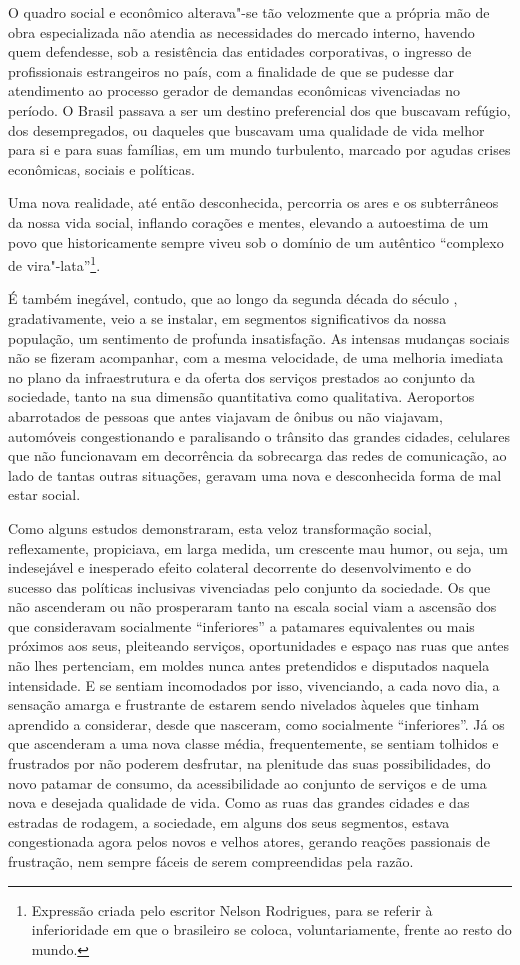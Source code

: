 O quadro social e econômico alterava"-se tão velozmente que a própria mão
de obra especializada não atendia as necessidades do mercado interno,
havendo quem defendesse, sob a resistência das entidades corporativas, o
ingresso de profissionais estrangeiros no país, com a finalidade de que
se pudesse dar atendimento ao processo gerador de demandas econômicas
vivenciadas no período. O Brasil passava a ser um destino preferencial
dos que buscavam refúgio, dos desempregados, ou daqueles que buscavam
uma qualidade de vida melhor para si e para suas famílias, em um mundo
turbulento, marcado por agudas crises econômicas, sociais e políticas.

Uma nova realidade, até então desconhecida, percorria os ares e os
subterrâneos da nossa vida social, inflando corações e mentes, elevando
a autoestima de um povo que historicamente sempre viveu sob o domínio de
um autêntico ``complexo de vira"-lata''\footnote{Expressão criada
  pelo escritor Nelson Rodrigues, para se referir à inferioridade em que
  o brasileiro se coloca, voluntariamente, frente ao resto do mundo.}.

É também inegável, contudo, que ao longo da segunda década do século
, gradativamente, veio a se instalar, em segmentos significativos da
nossa população, um sentimento de profunda insatisfação. As intensas
mudanças sociais não se fizeram acompanhar, com a mesma velocidade, de
uma melhoria imediata no plano da infraestrutura e da oferta dos
serviços prestados ao conjunto da sociedade, tanto na sua dimensão
quantitativa como qualitativa. Aeroportos abarrotados de pessoas que
antes viajavam de ônibus ou não viajavam, automóveis congestionando e
paralisando o trânsito das grandes cidades, celulares que não
funcionavam em decorrência da sobrecarga das redes de comunicação, ao
lado de tantas outras situações, geravam uma nova e desconhecida forma
de mal estar social.

Como alguns estudos demonstraram, esta veloz transformação social,
reflexamente, propiciava, em larga medida, um crescente mau humor, ou
seja, um indesejável e inesperado efeito colateral decorrente do
desenvolvimento e do sucesso das políticas inclusivas vivenciadas pelo
conjunto da sociedade. Os que não ascenderam ou não prosperaram tanto na
escala social viam a ascensão dos que consideravam socialmente
``inferiores'' a patamares equivalentes ou mais próximos aos seus,
pleiteando serviços, oportunidades e espaço nas ruas que antes não lhes
pertenciam, em moldes nunca antes pretendidos e disputados naquela
intensidade. E se sentiam incomodados por isso, vivenciando, a cada novo
dia, a sensação amarga e frustrante de estarem sendo nivelados àqueles
que tinham aprendido a considerar, desde que nasceram, como socialmente
``inferiores''. Já os que ascenderam a uma nova classe média,
frequentemente, se sentiam tolhidos e frustrados por não poderem
desfrutar, na plenitude das suas possibilidades, do novo patamar de
consumo, da acessibilidade ao conjunto de serviços e de uma nova e
desejada qualidade de vida. Como as ruas das grandes cidades e das
estradas de rodagem, a sociedade, em alguns dos seus segmentos, estava
congestionada agora pelos novos e velhos atores, gerando reações
passionais de frustração, nem sempre fáceis de serem compreendidas pela
razão.

